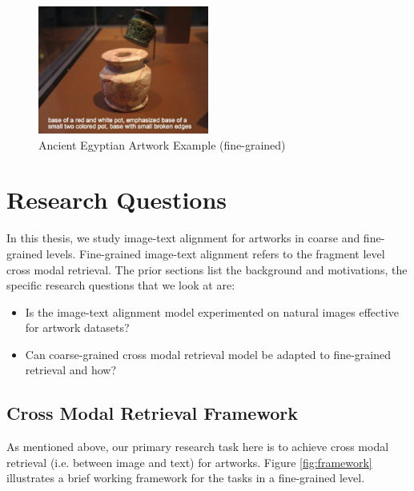 \begin{figure}[h!]
\centering
\includegraphics[width=0.5\textwidth]{artwork_fine2.pdf}
\caption{Ancient Egyptian Artwork Example (fine-grained)}
\label{fig:artwork2}
\end{figure}

\section{Research Questions}

In this thesis, we study image-text alignment for artworks in coarse and fine-grained levels. Fine-grained image-text alignment refers to the fragment level cross modal retrieval. The prior sections list the background and motivations, the specific research questions that we look at are:

\begin{itemize}
    \item Is the image-text alignment model experimented on natural images effective for artwork datasets?
    \item Can coarse-grained cross modal retrieval model be adapted to fine-grained retrieval and how?
\end{itemize}

\subsection{Cross Modal Retrieval Framework}

As mentioned above, our primary research task here is to achieve cross modal retrieval (i.e. between image and text) for artworks. Figure \ref{fig:framework} illustrates a brief working framework for the tasks in a fine-grained level.

